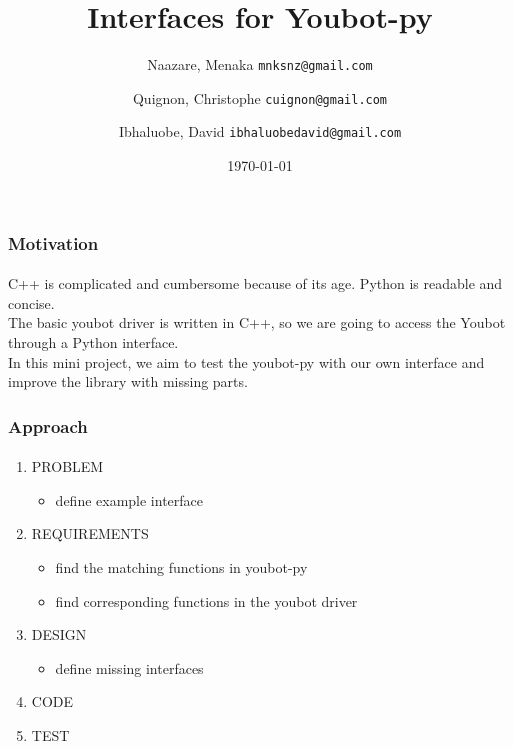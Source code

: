 \documentclass{beamer}
\begin{document}
\title{Interfaces for Youbot-py}
\author{
  Naazare, Menaka \texttt{mnksnz@gmail.com}
  \\ \and
  Quignon, Christophe
  \texttt{cuignon@gmail.com}
  \\ \and
  Ibhaluobe, David
  \texttt{ibhaluobedavid@gmail.com}
}
\date{\today}

\begin{frame}
\titlepage
\end{frame}

%

%

%
%
%
\begin{frame}
\frametitle{Motivation}
\framesubtitle{}
C++ is complicated and cumbersome because of its age. Python is readable and concise.\\
The basic youbot driver is written in C++, so we are going to access the Youbot through a Python interface.\\[\baselineskip]
In this mini project, we aim to test the youbot-py with our own interface and improve the library with missing parts.  
\end{frame}


\begin{frame}
\frametitle{Approach}
\framesubtitle{}
  \begin{enumerate}   \item PROBLEM
   \begin{itemize}  \item define example interface\end{itemize}
   \item REQUIREMENTS
   \begin{itemize}    
    \item find the matching functions in youbot-py 
    \item find corresponding functions in the youbot driver 
   \end{itemize}
   \item DESIGN \begin{itemize} \item define missing interfaces \end{itemize}
   \item CODE
   \item TEST
  \end{enumerate}

\end{frame}
\end{document}
